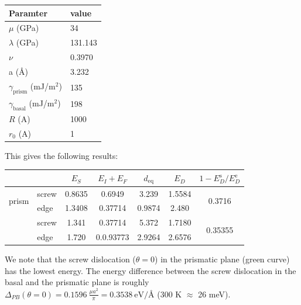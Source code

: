 \documentclass[10pt,a4paper,final]{article}
\begin{document}
\begin{table}[hb]
\centering

\begin{tabular}{ll} \toprule
Paramter & value \\ \midrule
$\mu$ (GPa) & 34 \\
$\lambda$ (GPa) & 131.143 \\
$\nu$ & 0.3970 \\
a (\AA) & 3.232 \\
$\gamma_{\text{prism}}$ (mJ/m$^2$) & 135 \\
$\gamma_{\text{basal}}$ (mJ/m$^2$) & 198 \\ 
$R$ (A) & 1000 \\
$r_0$ (A) & 1 \\
\bottomrule
\end{tabular}
\end{table}

This gives the following results:

\begin{table}[hbt]
\centering
\begin{tabular}{llccc|cc} \toprule
& & $E_{S}$ & $E_I+E_F$ & $d_\text{eq}$ & $E_D$ & $1-E^\text{s}_D/E^\text{e}_D$ \\ \midrule
\multirow{2}{*}{prism} & screw & 0.8635 & 0.6949 & 3.239 & 1.5584 & \multirow{2}{*}{0.3716}\\ & edge & 1.3408 & 0.37714 & 0.9874 & 2.480 & \\ 
\rule{0pt}{4ex} \multirow{2}{*}{basal} & screw & 1.341 & 0.37714 & 5.372 & 1.7180 & \multirow{2}{*}{0.35355} \\ & edge & 1.720 & 0.0.93773 & 2.9264 & 2.6576 & \\ 
\bottomrule

\end{tabular}

\end{table}

We note that the screw dislocation ($\theta=0$) in the prismatic plane (green curve) has the lowest energy. The energy difference between the screw dislocation in the basal and the prismatic plane is roughly $\Delta_{PB}(\theta=0) = 0.1596 ~\frac{\mu a^2}{\pi} = 0.3538 ~\text{eV/\AA}$ (300 K $\approx$ 26 meV).
\end{document}
